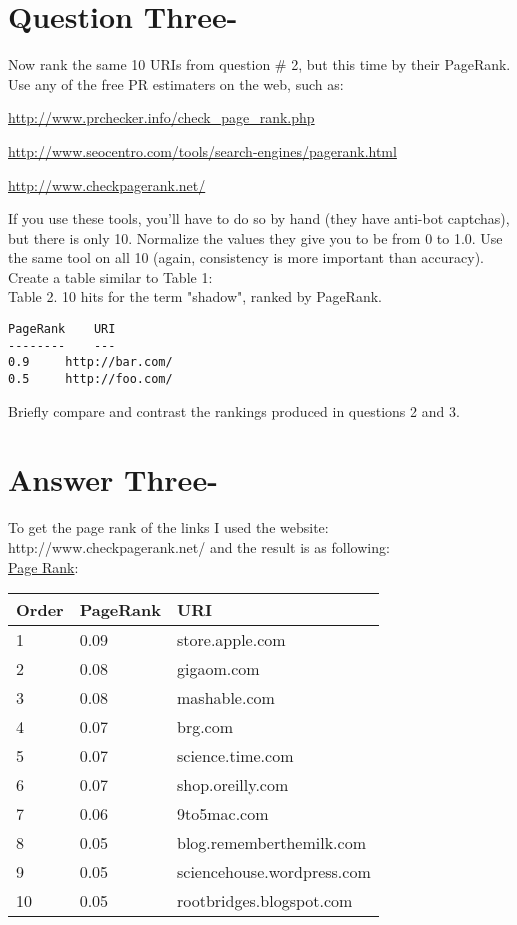 \documentclass[letterpaper,11pt]{article}
\begin{document}
\pagebreak


\section*{Question Three-}
Now rank the same 10 URIs from question \# 2, but this time 
by their PageRank.  Use any of the free PR estimaters on the web,
such as:

\url{http://www.prchecker.info/check_page_rank.php}

\url{http://www.seocentro.com/tools/search-engines/pagerank.html}

\url{http://www.checkpagerank.net/}

If you use these tools, you'll have to do so by hand (they have
anti-bot captchas), but there is only 10.  Normalize the values
they give you to be from 0 to 1.0.  Use the same tool on all 10
(again, consistency is more important than accuracy).\\
Create a table similar to Table 1:\\
Table 2.  10 hits for the term "shadow", ranked by PageRank.
\begin{verbatim}
PageRank	URI
--------	---
0.9		http://bar.com/
0.5		http://foo.com/
\end{verbatim}
Briefly compare and contrast the rankings produced in questions 2 and 3.
\pagebreak

\section*{Answer Three-}
To get the page rank of the links I used the website:
http://www.checkpagerank.net/
and the result is as following:\\

\uline{Page Rank}:
\begin{table}[H]
    \begin{tabular}{|| l || l || l ||}\hline
    Order & PageRank & URI \\\hline
    1 & 0.09	 & store.apple.com \\\hline
    2 & 0.08 & gigaom.com \\\hline
    3 & 0.08	 & mashable.com \\\hline
    4 & 0.07 & brg.com \\\hline
    5 & 0.07 & science.time.com \\\hline
    6 & 0.07 & shop.oreilly.com \\\hline
    7 & 0.06	 & 9to5mac.com \\\hline
    8 & 0.05	 & blog.rememberthemilk.com \\\hline
    9 & 0.05	 & sciencehouse.wordpress.com \\\hline
    10 & 0.05 & rootbridges.blogspot.com \\ \hline   
    \end{tabular}
    
\end{table}
\end{document}
